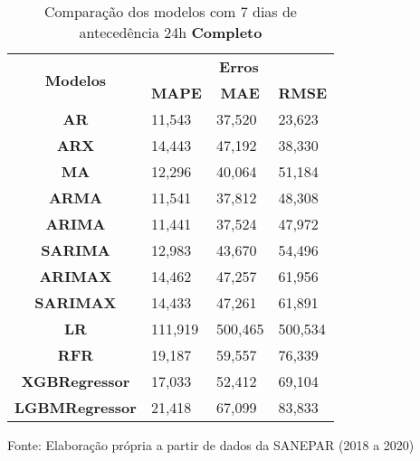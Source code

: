 \begin{table}[H]
	\centering
	\caption{Comparação dos modelos com 7 dias de antecedência 24h \textbf{Completo} }\label{tb:10-24cm}
	\begin{tabular}{@{}clll@{}}
		\toprule
		\multirow{2}{*}{\textbf{Modelos}} & \multicolumn{3}{c}{\textbf{Erros}}                                                                       \\ \cmidrule(l){2-4} 
		& \multicolumn{1}{c}{\textbf{MAPE}} & \multicolumn{1}{c}{\textbf{MAE}} & \multicolumn{1}{c}{\textbf{RMSE}} \\ \hline
\textbf{AR}                       & 11,543                            & 37,520                           & 23,623                            \\
\textbf{ARX}                      & 14,443                            & 47,192                           & 38,330                            \\
\textbf{MA}                       & 12,296                            & 40,064                           & 51,184                            \\
\textbf{ARMA}                     & 11,541                            & 37,812                           & 48,308                            \\
\textbf{ARIMA}                    & 11,441                            & 37,524                           & 47,972                            \\
\textbf{SARIMA}                   & 12,983                            & 43,670                           & 54,496                            \\
\textbf{ARIMAX}                   & 14,462                            & 47,257                           & 61,956                            \\
\textbf{SARIMAX}                  & 14,433                            & 47,261                           & 61,891                            \\
\textbf{LR}        & 111,919                           & 500,465                          & 500,534                           \\
\textbf{RFR}  & 19,187                            & 59,557                           & 76,339                            \\
\textbf{XGBRegressor}             & 17,033                            & 52,412                           & 69,104                            \\
\textbf{LGBMRegressor}            & 21,418                            & 67,099                           & 83,833                            \\ \bottomrule
	\end{tabular}

Fonte: Elaboração própria a partir de dados da SANEPAR (2018 a 2020)
\end{table}


